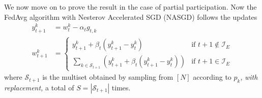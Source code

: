 %
We now move on to prove the result in the case of partial participation.
Now the FedAvg algorithm with Nesterov Accelerated SGD (NASGD) follows
the updates
\begin{align*}
y_{t+1}^{k} & =w_{t}^{k}-\alpha_{t}g_{t,k}\\
w_{t+1}^{k} & =\begin{cases}
y_{t+1}^{k}+\beta_{t}(y_{t+1}^{k}-y_{t}^{k}) & \text{if }t+1\notin\mathcal{I}_{E}\\
\sum_{k\in\mathcal{S}_{t+1}}\left(y_{t+1}^{k}+\beta_{t}(y_{t+1}^{k}-y_{t}^{k})\right) & \text{if }t+1\in\mathcal{I}_{E}
\end{cases}
\end{align*}
where $\mathcal{S}_{t+1}$ is the multiset obtained by sampling from
$[N]$ according to $p_{k}$, \emph{with replacement, }a total of
$S=|\mathcal{S}_{t+1}|$ times. 

